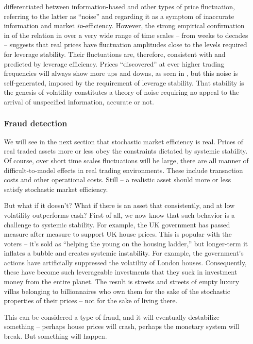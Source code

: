 \cite{Black1986} differentiated between information-based and other types of price fluctuation, referring to the latter as ``noise'' and regarding it as a symptom of inaccurate information and market {\it in}-efficiency. However, the strong empirical confirmation in  of the relation in  over a very wide range of time scales -- from weeks to decades -- suggests that real prices have fluctuation amplitudes close to the levels required for leverage stability. Their fluctuations are, therefore, consistent with and predicted by leverage efficiency. Prices ``discovered'' at ever higher trading frequencies will always show more ups and downs, as seen in , but this noise is self-generated, imposed by the requirement of leverage stability. That stability is the genesis of volatility constitutes a theory of noise requiring no appeal to the arrival of unspecified information, accurate or not.

\subsubsection{Fraud detection}
We will see in the next section that stochastic market efficiency is real. Prices of real traded assets more or less obey the constraints dictated by systemic stability. Of course, over short time scales fluctuations will be large, there are all manner of difficult-to-model effects in real trading environments. These include transaction costs and other operational costs. Still -- a realistic asset should more or less satisfy stochastic market efficiency.

But what if it doesn't? What if there is an asset that consistently, and at low volatility outperforms cash? First of all, we now know that such behavior is a challenge to systemic stability. For example, the UK government has passed measure after measure to support UK house prices. This is popular with the voters -- it's sold as ``helping the young on the housing ladder,'' but longer-term it inflates a bubble and creates systemic instability. For example, the government's actions have artificially suppressed the volatility of London houses. Consequently, these have become such leverageable investments that they suck in investment money from the entire planet. The result is streets and streets of empty luxury villas belonging to billionnaires who own them for the sake of the stochastic properties of their prices -- not for the sake of living there.

This can be considered a type of fraud, and it will eventually destabilize something -- perhaps house prices will crash, perhaps the monetary system will break. But something will happen.

